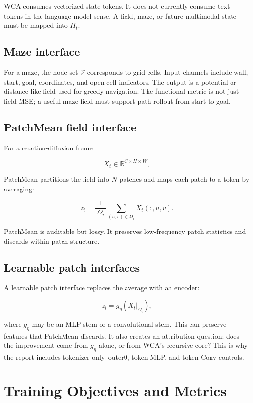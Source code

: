 \documentclass[11pt]{article}
\newcommand{\R}{\mathbb{R}}
\newcommand{\V}{\mathcal{V}}
\begin{document}
WCA consumes vectorized state tokens. It does not currently consume text tokens
in the language-model sense. A field, maze, or future multimodal state must be
mapped into $H_t$.

\subsection{Maze interface}

For a maze, the node set $\V$ corresponds to grid cells. Input channels include
wall, start, goal, coordinates, and open-cell indicators. The output is a
potential or distance-like field used for greedy navigation. The functional
metric is not just field MSE; a useful maze field must support path rollout
from start to goal.

\subsection{PatchMean field interface}

For a reaction-diffusion frame

\[
X_t \in \R^{C \times H \times W},
\]

PatchMean partitions the field into $N$ patches and maps each patch to a token
by averaging:

\[
z_i
=
\frac{1}{|\Omega_i|}
\sum_{(u,v)\in \Omega_i}
X_t(:,u,v).
\]

PatchMean is auditable but lossy. It preserves low-frequency patch statistics
and discards within-patch structure.

\subsection{Learnable patch interfaces}

A learnable patch interface replaces the average with an encoder:

\[
z_i = g_\eta(X_t|_{\Omega_i}),
\]

where $g_\eta$ may be an MLP stem or a convolutional stem. This can preserve
features that PatchMean discards. It also creates an attribution question:
does the improvement come from $g_\eta$ alone, or from WCA's recursive core?
This is why the report includes tokenizer-only, outer0, token MLP, and token
Conv controls.

\section{Training Objectives and Metrics}
\end{document}

